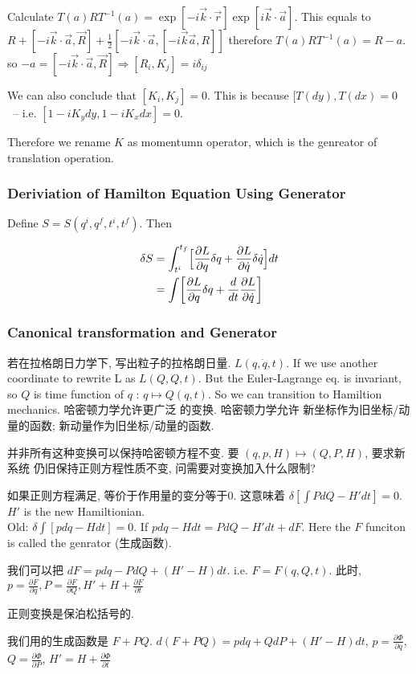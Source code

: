 \documentclass{ctexart}
\begin{document}
Calculate $T(a)R T^{-1}(a) = \exp[-i \vec{k}\cdot \vec{r}] \exp[i \vec{k}\cdot
\vec{a} ]$. This equals to $R+[-i \vec{k}\cdot \vec{a}, \vec{R}] + \frac{1}{2}
[-i \vec{k} \cdot \vec{a}, [ - i \vec{k} \vec{a}, R]]$
therefore $T(a)R T^{-1}(a) = R - a$. 
so $-a = [-i \vec{k} \cdot \vec{a}, \vec{R}] \Rightarrow [R_i ,K_j ]=i
\delta_{ij}$ 

We can also conclude that $[K_i ,K_j ]=0$. This is because 
$[T(dy),T(dx)=0$ ~-- i.e. $[1-i K_y dy, 1 -i K_x dx]=0$. 

Therefore we rename $K$ as momentumn operator, which is the genreator of
translation operation. 

\subsubsection{Deriviation of Hamilton Equation Using Generator} 

Define  $S = S( q^i, q^f, t^i, t^f)$. Then 

\[
\begin{align*}
    \delta S 
    &= \int_{t^i}^{t_f} 
    \Bigl[ \frac{\partial L}{\partial q} \delta q 
    + \frac{\partial L}{\partial \dot{q}} \delta \dot{q}\Bigr] dt \\
    &= \int \biggl[ \frac{\partial L}{\partial q} \delta q 
    + \frac{d}{dt} \frac{\partial L}{\partial \dot{q}} \biggr]
\end{align*}
\]

\subsubsection{Canonical transformation and Generator}

若在拉格朗日力学下, 写出粒子的拉格朗日量. $L(q, \dot{q}, t)$. If we use another
coordinate to rewrite L as $L(Q, Q, t)$. But the Euler-Lagrange eq. is
invariant, so $Q$ is time function of $q$ : $q \mapsto Q(q,t)$. So we can
transition to Hamiltion mechanics. 哈密顿力学允许更广泛 的变换. 哈密顿力学允许
新坐标作为旧坐标/动量的函数; 新动量作为旧坐标/动量的函数. 

并非所有这种变换可以保持哈密顿方程不变. 要 $(q,p,H)\mapsto (Q,P,H)$, 要求新系统
仍旧保持正则方程性质不变, 问需要对变换加入什么限制? 

如果正则方程满足, 等价于作用量的变分等于0. 这意味着 
$\delta [\int PdQ - H' dt] =0$. $H'$ is the new Hamiltionian. \\
Old: $\delta \int [pdq - Hdt]=0$. 
If $pdq - Hdt = PdQ - H'dt + dF$. Here the $F$ funciton is called the genrator
(生成函数). 

我们可以把 $dF = pdq - PdQ + (H'-H) dt$. i.e. $F=F(q,Q,t)$. 此时,
$p = \frac{\partial F}{\partial q} , P = \frac{\partial F}{\partial Q}, H' + H
+ \frac{\partial F}{\partial t} $ 

正则变换是保泊松括号的. 

我们用的生成函数是 $F+PQ$. 
$d(F+PQ) = pdq + QdP + (H' -H) dt$, $p = \frac{\partial \Phi }{\partial q} $, 
$Q = \frac{\partial \Phi }{\partial P} $, $H' = H + \frac{\partial \Phi }{\partial
t} $
\end{document}
